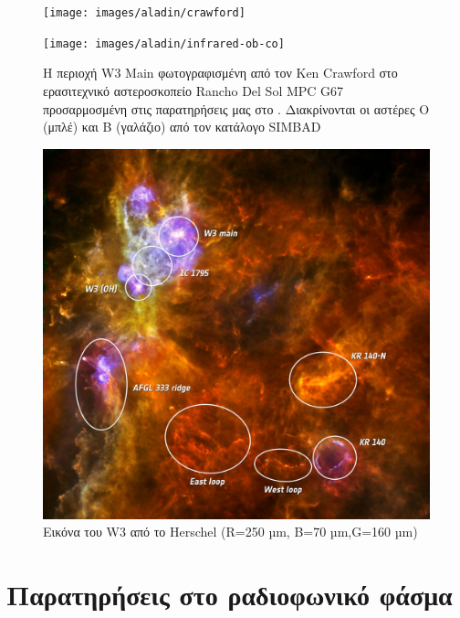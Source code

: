 \documentclass[a4paper,12pt]{memoir}
\begin{document}
\begin{figure}[h]
	\centering
	\texttt{[image: images/aladin/crawford]}
	\caption{Η περιοχή W3 Main φωτογραφισμένη από τον Ken Crawford στο ερασιτεχνικό αστεροσκοπείο Rancho Del Sol MPC G67 προσαρμοσμένη στις παρατηρήσεις μας στο . Διακρίνονται οι αστέρες O (μπλέ) και B (γαλάζιο) από τον κατάλογο SIMBAD}
	
	\centering
	\texttt{[image: images/aladin/infrared-ob-co]}
\end{figure}


\begin{figure}[h]
	\centering
	\includegraphics[width=13cm]{images/w3_70_160_250_annotated.jpg}
	\caption{Εικόνα του W3 από το Herschel (R=250 µm, B=70 µm,G=160 µm)}
\end{figure}



\chapter{Παρατηρήσεις στο ραδιοφωνικό φάσμα}
\end{document}
